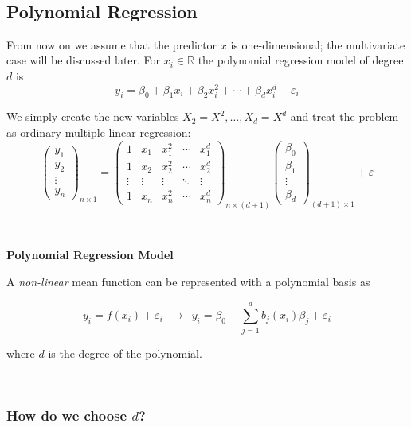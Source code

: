 \documentclass[
]{book}
\begin{document}
~

\subsection{Polynomial Regression}\label{polynomial-regression-1}

From now on we assume that the predictor \(x\) is one-dimensional; the multivariate case will be discussed later. For \(x_i\in\mathbb{R}\) the polynomial regression model of degree \(d\) is
\[
y_i = \beta_0 + \beta_1 x_i + \beta_2 x_i^2 + \cdots + \beta_d x_i^d + \varepsilon_i
\]

We simply create the new variables \(X_2 = X^2, \ldots, X_d = X^d\) and treat the problem as ordinary multiple linear regression:
\[
\begin{pmatrix}
y_1 \\ y_2 \\ \vdots \\ y_n
\end{pmatrix}_{n \times 1}
=
\begin{pmatrix}
1 & x_1 & x_1^2 & \cdots & x_1^d \\
1 & x_2 & x_2^2 & \cdots & x_2^d \\
\vdots & \vdots & \vdots & \ddots & \vdots \\
1 & x_n & x_n^2 & \cdots & x_n^d
\end{pmatrix}_{n \times (d+1)}
\begin{pmatrix}
\beta_0 \\ \beta_1 \\ \vdots \\ \beta_d
\end{pmatrix}_{(d+1) \times 1}
+ \varepsilon
\]

~

\textbf{Polynomial Regression Model}

A \emph{non-linear} mean function can be represented with a polynomial basis as

\[y_i = f(x_i) + \varepsilon_i \,\,\, \longrightarrow \,\,\, y_i =\beta_0 + \sum_{j=1}^{d} b_j(x_i) \beta_j + \varepsilon_i\]

where \(d\) is the degree of the polynomial.

~

\subsubsection*{\texorpdfstring{How do we choose \(d\)? }{How do we choose d? }}\label{how-do-we-choose-d}
\end{document}
